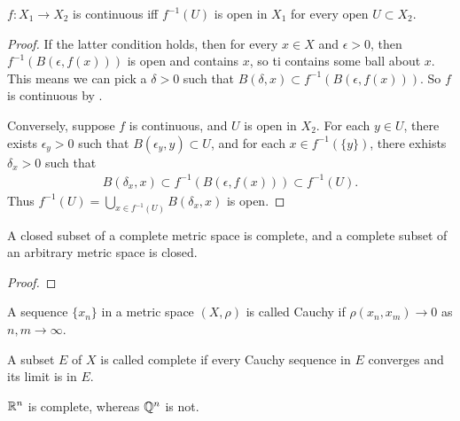 \begin{proposition}
    $f: X_1 \to X_2$ is continuous iff $f^{-1}(U)$ is open in $X_1$ for every open $U \subset X_2$.
\end{proposition}

\begin{proof}
    If the latter condition holds, then for every $x \in X$ and $\epsilon > 0$, then $f^{-1} \left( B(\epsilon, f(x)) \right)$ is open and contains $x$, so ti contains some ball about $x$.
    This means we can pick a $\delta > 0$ such that $B(\delta, x) \subset f^{-1}\left( B(\epsilon, f(x)) \right)$.
    So $f$ is continuous by .

    Conversely, suppose $f$ is continuous, and $U$ is open in $X_2$.
    For each $y \in U$, there exists $\epsilon_y > 0$ such that $B(\epsilon_y, y) \subset U$, and for each $x \in f^{-1}(\{ y \})$, there exhists $\delta_x > 0$ such that 
    \begin{align}
        B(\delta_x, x) \subset f^{-1}\left( B(\epsilon, f(x)) \right) \subset f^{-1}(U).
    \end{align}
    Thus $f^{-1}(U) = \bigcup_{x \in f^{-1}(U)} B(\delta_x, x)$ is open.
\end{proof}

\begin{proposition}
    A closed subset of a complete metric space is complete, and a complete subset of an arbitrary metric space is closed.
\end{proposition}

\begin{proof}
    
\end{proof}

\begin{definition}[Cauchy]
    A sequence $\{x_n\}$ in a metric space $(X, \rho)$ is called Cauchy if $\rho(x_n, x_m) \to 0$ as $n, m\to \infty$.
\end{definition}

\begin{definition}[Complete]
    A subset $E$ of $X$ is called complete if every Cauchy sequence in $E$ converges and its limit is in $E$.
\end{definition}

\begin{example}
    $\mathbb{R}^n$ is complete, whereas $\mathbb{Q}^n$ is not.
\end{example}

